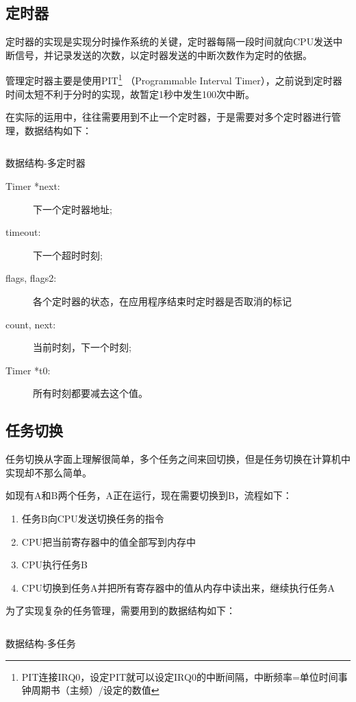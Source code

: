   \subsection{定时器}

  定时器的实现是实现分时操作系统的关键，定时器每隔一段时间就向CPU发送中断信号，并记录发送的次数，以定时器发送的中断次数作为定时的依据。

  管理定时器主要是使用PIT\footnote{PIT连接IRQ0，设定PIT就可以设定IRQ0的中断间隔，中断频率=单位时间事钟周期书（主频）/设定的数值}
  （Programmable Interval Timer），之前说到定时器时间太短不利于分时的实现，故暂定1秒中发生100次中断。

  在实际的运用中，往往需要用到不止一个定时器，于是需要对多个定时器进行管理，数据结构如下：

  \begin{listing}[H]
    \inputminted[tabsize=2, firstline=175, lastline=187,
    linenos=true]{c}{../ZOS/src/kernel/bootpack.h}
    \caption{数据结构-多定时器}
        \label{lst:multi_timer}
  \end{listing}

  \begin{description}
    \item[Timer *next:]下一个定时器地址;
    \item[timeout:]下一个超时时刻;
    \item[flags, flags2:]各个定时器的状态，在应用程序结束时定时器是否取消的标记
    \item[count, next:]当前时刻，下一个时刻;
    \item[Timer *t0:]所有时刻都要减去这个值。
    \end{description}

    \subsection{任务切换}

    任务切换从字面上理解很简单，多个任务之间来回切换，但是任务切换在计算机中实现却不那么简单。

    如现有A和B两个任务，A正在运行，现在需要切换到B，流程如下：
    \begin{enumerate}
        \item 任务B向CPU发送切换任务的指令
        \item CPU把当前寄存器中的值全部写到内存中
        \item CPU执行任务B
        \item CPU切换到任务A并把所有寄存器中的值从内存中读出来，继续执行任务A
    \end{enumerate}
    为了实现复杂的任务管理，需要用到的数据结构如下：
    \begin{listing}[H]
        \inputminted[tabsize=2, firstline=227, lastline=232,
        linenos=true]{c}{../ZOS/src/kernel/bootpack.h}
        \caption{数据结构-多任务}
        \label{lst:multi_task}
      \end{listing}

